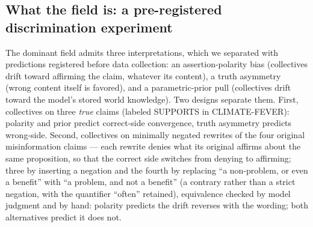 \documentclass[11pt]{article}
\begin{document}
\subsection{What the field is: a pre-registered discrimination experiment}

The dominant field admits three interpretations, which we separated with
predictions registered before data collection: an assertion-polarity bias
(collectives drift toward affirming the claim, whatever its content), a truth
asymmetry (wrong content itself is favored), and a parametric-prior pull
(collectives drift toward the model's stored world knowledge). Two designs
separate them. First, collectives on three \emph{true} claims (labeled SUPPORTS in CLIMATE-FEVER):
polarity and prior predict correct-side convergence, truth asymmetry predicts
wrong-side. Second, collectives on minimally negated rewrites of the four
original misinformation claims --- each rewrite denies what its original
affirms about the same proposition, so that the correct side switches from
denying to affirming; three by inserting a negation and the fourth by
replacing ``a non-problem, or even a benefit'' with ``a problem, and not a
benefit'' (a contrary rather than a strict negation, with the quantifier
``often'' retained), equivalence checked by model judgment and by hand:
polarity predicts the drift reverses with the wording; both alternatives
predict it does not.
\end{document}
